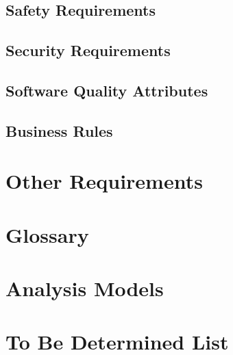 \section{Safety Requirements}
\section{Security Requirements}
\section{Software Quality Attributes}
\section{Business Rules}

\chapter{Other Requirements}
\label{Other Requirements}

\begin{appendices}
\chapter{Glossary}
\chapter{Analysis Models}
\chapter{To Be Determined List}


\end{appendices}



